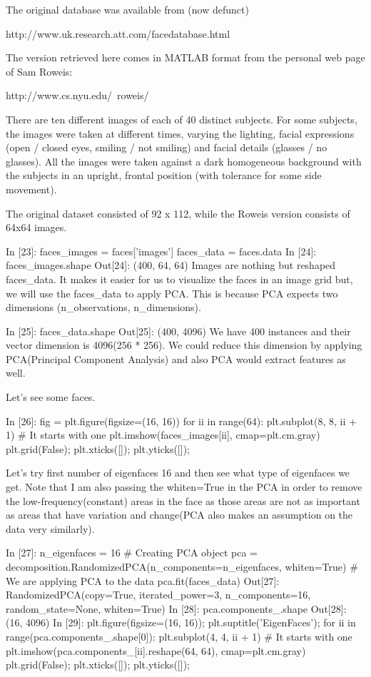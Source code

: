 The original database was available from (now defunct)

    http://www.uk.research.att.com/facedatabase.html

The version retrieved here comes in MATLAB format from the personal
web page of Sam Roweis:

    http://www.cs.nyu.edu/~roweis/

There are ten different images of each of 40 distinct subjects. For some
subjects, the images were taken at different times, varying the lighting,
facial expressions (open / closed eyes, smiling / not smiling) and facial
details (glasses / no glasses). All the images were taken against a dark
homogeneous background with the subjects in an upright, frontal position (with
tolerance for some side movement).

The original dataset consisted of 92 x 112, while the Roweis version
consists of 64x64 images.


In [23]:
faces_images = faces['images']
faces_data = faces.data
In [24]:
faces_images.shape
Out[24]:
(400, 64, 64)
Images are nothing but reshaped faces_data. It makes it easier for us to visualize the faces in an image grid but, we will use the faces_data to apply PCA. This is because PCA expects two dimensions (n_observations, n_dimensions).

In [25]:
faces_data.shape
Out[25]:
(400, 4096)
We have 400 instances and their vector dimension is 4096(256 * 256). We could reduce this dimension by applying PCA(Principal Component Analysis) and also PCA would extract features as well.

Let's see some faces.

In [26]:
fig = plt.figure(figsize=(16, 16))
for ii in range(64):
    plt.subplot(8, 8, ii + 1) # It starts with one
    plt.imshow(faces_images[ii], cmap=plt.cm.gray)
    plt.grid(False);
    plt.xticks([]);
    plt.yticks([]);

Let's try first number of eigenfaces 16 and then see what type of eigenfaces we get. Note that I am also passing the whiten=True in the PCA in order to remove the low-frequency(constant) areas in the face as those areas are not as important as areas that have variation and change(PCA also makes an assumption on the data very similarly).

In [27]:
n_eigenfaces = 16
# Creating PCA object
pca = decomposition.RandomizedPCA(n_components=n_eigenfaces, whiten=True)
# We are applying PCA to the data
pca.fit(faces_data)
Out[27]:
RandomizedPCA(copy=True, iterated_power=3, n_components=16, random_state=None,
       whiten=True)
In [28]:
pca.components_.shape
Out[28]:
(16, 4096)
In [29]:
plt.figure(figsize=(16, 16));
plt.suptitle('EigenFaces');
for ii in range(pca.components_.shape[0]):
    plt.subplot(4, 4, ii + 1) # It starts with one
    plt.imshow(pca.components_[ii].reshape(64, 64), cmap=plt.cm.gray)
    plt.grid(False);
    plt.xticks([]);
    plt.yticks([]);

